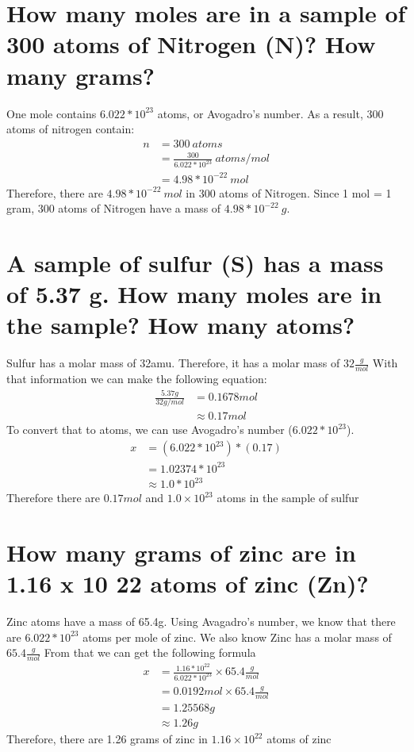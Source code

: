 \documentclass[11pt]{article}
\begin{document}
\section{How many moles are in a sample of 300 atoms of Nitrogen (N)? How many grams?}
\label{sec:org4ac8e35}
One mole contains \(6.022 *10^{23}\) atoms, or Avogadro's number. As a result, 300 atoms of nitrogen contain:
\begin{align*}
n&=300\ atoms\\
&=\frac{300}{6.022*10^{23}}\ atoms/mol\\
&=4.98*10^{-22}\ mol
\end{align*}
Therefore, there are \(4.98*10^{-22}\ mol\) in 300 atoms of Nitrogen. Since 1 mol = 1 gram, 300 atoms of Nitrogen have a mass of \(4.98*10^{-22}\ g\).

\section{A sample of sulfur (S) has a mass of 5.37 g. How many moles are in the sample? How many atoms?}
\label{sec:org50301a4}
Sulfur has a molar mass of 32amu. Therefore, it has a molar mass of
\(32\frac{g}{mol}\)
With that information we can make the following equation:
\begin{align*}
\frac{5.37g}{32g/mol}&=0.1678mol\\
&\approx0.17mol
\end{align*}
To convert that to atoms, we can use Avogadro's number (\(6.022 *10^{23}\)).
\begin{align*}
x&=(6.022*10^{23})*(0.17)\\
&=1.02374*10^{23}\\
&\approx1.0*10^{23}
\end{align*}
Therefore there are \(0.17mol\) and \(1.0\times10^{23}\) atoms in the sample of sulfur

\section{How many grams of zinc are in 1.16 x 10 22 atoms of zinc (Zn)?}
\label{sec:org9970eee}
Zinc atoms have a mass of 65.4g. Using Avagadro's number, we know that there are \(6.022 *10^{23}\) atoms per mole of zinc.
We also know Zinc has a molar mass of \(65.4\frac{g}{mol}\)
From that we can get the following formula
\begin{align*}
x&=\frac{1.16*10^{22}}{6.022*10^{23}}\times65.4 \frac{g}{mol}\\
&=0.0192mol\times65.4\frac{g}{mol}\\
&=1.25568g\\
&\approx1.26g
\end{align*}
Therefore, there are 1.26 grams of zinc in \(1.16\times10^{22}\) atoms  of zinc
\end{document}
